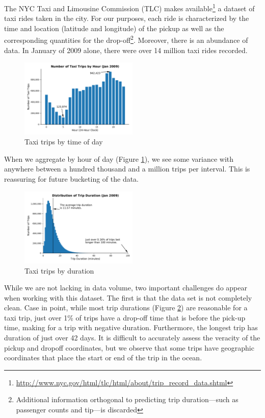 \documentclass{article}
\begin{document}
The NYC Taxi and Limousine Commission (TLC) makes
available\footnote{\url{http://www.nyc.gov/html/tlc/html/about/trip_record_data.shtml}}
a dataset of taxi rides taken in the city. For our purposes, each ride is
characterized by the time and location (latitude and longitude) of the pickup as
well as the corresponding quantities for the drop-off\footnote{Additional
information orthogonal to predicting trip duration---such as passenger
counts and tip---is discarded}. Moreover, there is an abundance of data. In
January of 2009 alone, there were over 14 million taxi rides recorded.

\begin{figure}[h]
\centering
\includegraphics[width=0.5\textwidth]{figs/ridesbyhour.pdf}
\caption{Taxi trips by time of day}
\label{fig:ridesbyhour}
\end{figure}

When we aggregate by hour of day (Figure \ref{fig:ridesbyhour}), we see some variance with anywhere between
a hundred thousand and a million trips per interval. This is reassuring for
future bucketing of the data. 


\begin{figure}[h]
\centering
\includegraphics[width=0.5\textwidth]{figs/tripdurations.pdf}
\caption{Taxi trips by duration}
\label{fig:tripdurations}
\end{figure}

While we are not lacking in data volume, two important challenges do appear when
working with this dataset. The first is that the data set is not completely clean.
Case in point, while most trip durations (Figure \ref{fig:tripdurations}) are
reasonable for a taxi trip, just over 1\% of trips have a drop-off time that is
before the pick-up time, making for a trip with negative duration. Furthermore,
the longest trip has duration of just over 42 days. It is difficult to
accurately assess
the veracity of the pickup and dropoff coordinates, but we observe
that some trips
have geographic coordinates that place the start or end of the trip in the
ocean.
\end{document}

